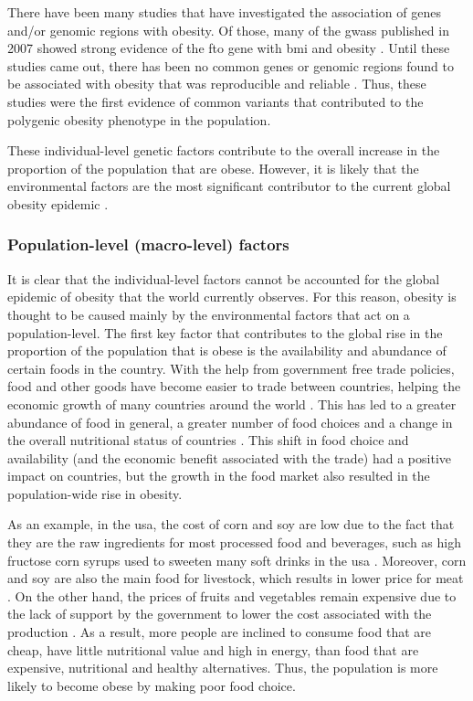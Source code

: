 There have been many studies that have investigated the association of genes and/or genomic regions with obesity.
Of those, many of the \glspl{gwas} published in 2007 showed strong evidence of the \gls{fto} gene with \gls{bmi} and obesity  \citep{Dina2007,Frayling2007,Gerken2007,Scuteri2007}.
Until these studies came out, there has been no common genes or genomic regions found to be associated with obesity that was reproducible and reliable \citep{Frayling2007}.
Thus, these studies were the first evidence of common variants that contributed to the polygenic obesity phenotype in the population.

These individual-level genetic factors contribute to the overall increase in the proportion of the population that are obese.
However, it is likely that the environmental factors are the most significant contributor to the current global obesity epidemic \citep{Malik2013}.

\subsubsection{Population-level (macro-level) factors}
\label{ssub:Population-level_(macro-level)_factors}

It is clear that the individual-level factors cannot be accounted for the global epidemic of obesity that the world currently observes.
For this reason, obesity is thought to be caused mainly by the environmental factors that act on a population-level.
The first key factor that contributes to the global rise in the proportion of the population that is obese is the availability and abundance of certain foods in the country.
With the help from government free trade policies, food and other goods have become easier to trade between countries, helping the economic growth of many countries around the world \citep{Kearney2010}.
This has led to a greater abundance of food in general, a greater number of food choices and a change in the overall nutritional status of countries \citep{Malik2013}.
This shift in food choice and availability (and the economic benefit associated with the trade) had a positive impact on countries, but the growth in the food market also resulted in the population-wide rise in obesity.

As an example, in the \gls{usa}, the cost of corn and soy are low due to the fact that they are the raw ingredients for most processed food and beverages, such as high fructose corn syrups used to sweeten many soft drinks in the \gls{usa} \citep{Malik2013}.
Moreover, corn and soy are also the main food for livestock, which results in lower price for meat \citep{Malik2013}.
On the other hand, the prices of fruits and vegetables remain expensive due to the lack of support by the government to lower the cost associated with the production \citep{Malik2013}.
As a result, more people are inclined to consume food that are cheap, have little nutritional value and high in energy, than food that are expensive, nutritional and healthy alternatives.
Thus, the population is more likely to become obese by making poor food choice.

